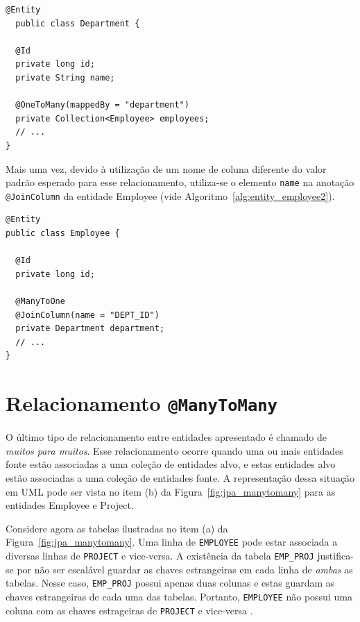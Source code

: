\documentclass[
  10.5pt,				  %
	openright,			%
	twoside,			  %
  a5paper,
  chapter=TITLE,	%
	section=TITLE,	%
  hyphens,        %
	english,        %
	brazil          %
]{abntex2}
\begin{document}
\begin{lstlisting}[caption={Classe Department e seus relacionamentos.}, label={alg:entity_dept}]
@Entity
  public class Department {

  @Id
  private long id;
  private String name;

  @OneToMany(mappedBy = "department")
  private Collection<Employee> employees;
  // ...
}
\end{lstlisting}
%

Mais uma vez, devido à utilização de um nome de coluna diferente do valor padrão esperado para esse relacionamento, utiliza-se o elemento \texttt{name} na anotação \texttt{@JoinColumn} da entidade Employee (vide Algoritmo~\ref{alg:entity_employee2}).

\begin{lstlisting}[caption={Classe Employee e seus relacionamentos.}, label={alg:entity_employee2}]
@Entity
public class Employee {

  @Id
  private long id;

  @ManyToOne
  @JoinColumn(name = "DEPT_ID")
  private Department department;
  // ...
}
\end{lstlisting}
%


\section{Relacionamento \texttt{@ManyToMany}}

O último tipo de relacionamento entre entidades apresentado é chamado de \emph{muitos para muitos}. Esse relacionamento ocorre quando uma ou mais entidades fonte estão associadas a uma coleção de entidades alvo, e estas entidades alvo estão associadas a uma coleção de entidades fonte. A representação dessa situação em UML pode ser vista no item (b) da Figura~\ref{fig:jpa_manytomany} para as entidades Employee e Project.

Considere agora as tabelas ilustradas no item (a) da Figura~\ref{fig:jpa_manytomany}. Uma linha de \texttt{EMPLOYEE} pode estar associada a diversas linhas de \texttt{PROJECT} e vice-versa. A existência da tabela \texttt{EMP\_PROJ} justifica-se por não ser escalável guardar as chaves estrangeiras em cada linha de \emph{ambas} as tabelas. Nesse caso, \texttt{EMP\_PROJ} possui apenas duas colunas e estas guardam as chaves estrangeiras de cada uma das tabelas. Portanto, \texttt{EMPLOYEE} não possui uma coluna com as chaves estrageiras de \texttt{PROJECT} e vice-versa \cite{keith2013}.
\end{document}
